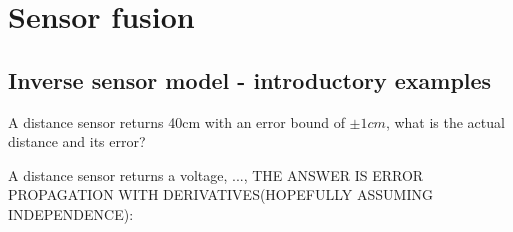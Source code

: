 \chapter{Sensor fusion}
\section{Inverse sensor model - introductory examples}
{
    A distance sensor returns 40cm with an error bound of $\pm 1cm$, what is the actual distance and its error?
}

{ 
    A distance sensor returns a voltage, ..., THE ANSWER IS ERROR PROPAGATION WITH DERIVATIVES(HOPEFULLY ASSUMING INDEPENDENCE):
}


